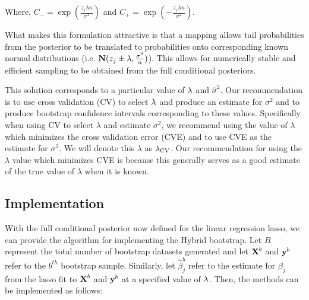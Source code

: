 
Where, $C_{-} = \exp(\frac{z_j \lambda n}{\sigma^2})$ and $C_{+} = \exp(-\frac{z_j \lambda n}{\sigma^2})$.

What makes this formulation attractive is that a mapping allows tail probabilities from the posterior to be translated to probabilities onto corresponding known normal distributions (i.e. $\mathbf{N}(z_j \pm \lambda, \frac{\sigma^2}{n})$). This allows for numerically stable and efficient sampling to be obtained from the full conditional posteriors.

This solution corresponds to a particular value of $\lambda$ and $\hat{\sigma}^2$. Our recommendation is to use cross validation (CV) to select $\lambda$ and produce an estimate for $\sigma^2$ and to produce bootstrap confidence intervals corresponding to these values. Specifically when using CV to select $\lambda$ and estimate $\sigma^2$, we recommend using the value of $\lambda$ which minimizes the cross validation error (CVE) and to use CVE as the estimate for $\sigma^2$. We will denote this $\lambda$ as $\lambda_{\textrm{CV}}$. Our recommendation for using the $\lambda$ value which minimizes CVE is because this generally serves as a good estimate of the true value of $\lambda$ when it is known.

\subsection{Implementation}
\label{Sec:implementation}

With the full conditional posterior now defined for the linear regression lasso, we can provide the algorithm for implementing the Hybrid bootstrap. Let $B$ represent the total number of bootstrap datasets generated and let $\boldsymbol{\mathbf{X}}^b$ and $\boldsymbol{\mathbf{y}}^{b}$ refer to the $b^{th}$ bootstrap sample. Similarly, let $\hat{\beta}^b_j$ refer to the estimate for $\beta_j$ from the lasso fit to $\boldsymbol{\mathbf{X}}^b$ and $\boldsymbol{\mathbf{y}}^b$ at a specified value of $\lambda$. Then, the methods can be implemented as follows:

